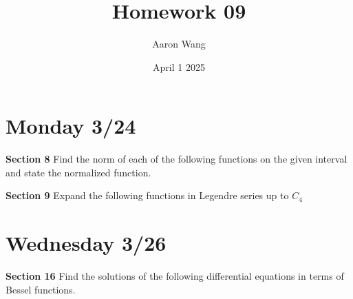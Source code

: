 \documentclass{article}
\title{Homework 09}
\author{Aaron Wang}
\date{April 1 2025}
\begin{document}
\maketitle
\section{Monday 3/24}
\begin{large}
 \textbf{Section 8} Find the norm of each of the following functions on the given interval and state the normalized function. 
\end{large}
\begin{enumerate}
    
    
    
\end{enumerate}
\begin{large}
 \textbf{Section 9} Expand the following functions in Legendre series up to $C_4$  
\end{large}
\begin{enumerate}
    \newpage
    \newpage
    \newpage
    
\end{enumerate}
\section{Wednesday 3/26}
\begin{large}
 \textbf{Section 16} Find the solutions of the following differential equations in terms of Bessel functions.
\end{large}
\begin{enumerate}
    
    
    
    
    
    
\end{enumerate}
\end{document}
